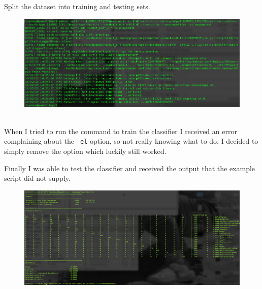 \documentclass[10pt]{article}
\begin{document}
\par
Split the dataset into training and testing sets.
\pagebreak
\begin{figure}[!h]
\includegraphics[scale=0.37]{split.png}
\centering
\end{figure}\\
\indent When I tried to run the command to train the classifier I received an error complaining about the \verb|-el| option, so not really knowing what to do, I decided to simply remove the option which luckily still worked. 
\par
{}%
\hfill
{}%
\par
Finally I was able to test the classifier and received the output that the example script did not supply.
\begin{figure}[!h]
\includegraphics[scale=0.37]{complete.png}
\centering
\end{figure}\\
\end{document}
